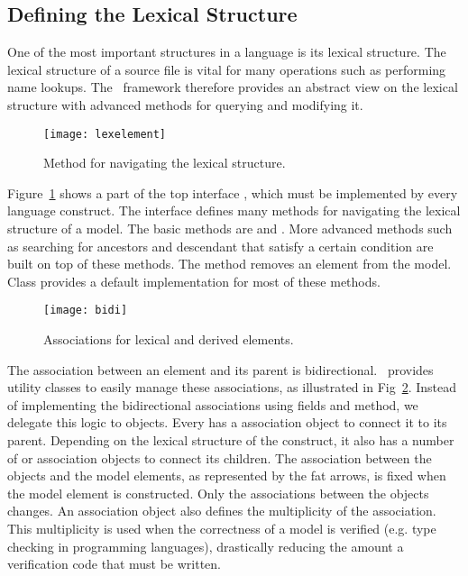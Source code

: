 \subsection{Defining the Lexical Structure}

One of the most important structures in a language is its lexical structure. The lexical structure of a source file is vital for many operations such as performing name lookups. The \chameleon\ framework therefore provides an abstract view on the lexical structure with advanced methods for querying and modifying it.
\begin{figure}
 \texttt{[image: lexelement]}
\caption{Method for navigating the lexical structure.\label{fig:lexelement}}
\end{figure}

Figure~\ref{fig:lexelement} shows a part of the top interface , which must be implemented by every language construct. The  interface defines many methods for navigating the lexical structure of a model. The basic methods are  and . More advanced methods such as searching for ancestors and descendant that satisfy a certain condition are built on top of these methods. The  method removes an element from the model. Class  provides a default implementation for most of these methods.

\begin{figure}[b]
 \texttt{[image: bidi]}
\caption{Associations for lexical and derived elements.\label{fig:association}}
\end{figure}

The association between an element and its parent is bidirectional. \chameleon\ provides utility classes to easily manage these associations, as illustrated in Fig~\ref{fig:association}. Instead of implementing the bidirectional associations using fields and method, we delegate this logic to  objects. Every  has a  association object to connect it to its parent. Depending on the lexical structure of the construct, it also has a number of  or  association objects to connect its children. The association between the  objects and the model elements, as represented by the fat arrows, is fixed when the model element is constructed. Only the associations between the  objects changes. An association object also defines the multiplicity of the association. This multiplicity is used when the correctness of a model is verified (e.g. type checking in programming languages), drastically reducing the amount a 
verification code 
that 
must be written.

